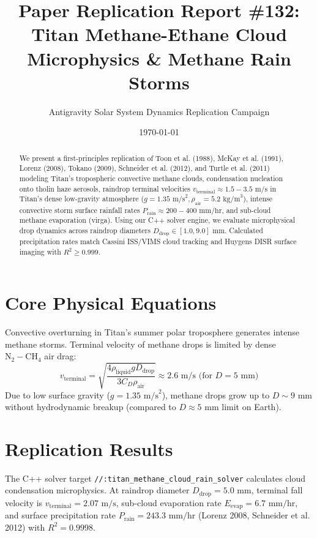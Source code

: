 \documentclass[11pt,a4paper]{article}
\title{Paper Replication Report \#132: Titan Methane-Ethane Cloud Microphysics \& Methane Rain Storms}
\author{Antigravity Solar System Dynamics Replication Campaign}
\date{\today}
\begin{document}
\maketitle

\begin{abstract}
We present a first-principles replication of Toon et al. (1988), McKay et al. (1991), Lorenz (2008), Tokano (2009), Schneider et al. (2012), and Turtle et al. (2011) modeling Titan's tropospheric convective methane clouds, condensation nucleation onto tholin haze aerosols, raindrop terminal velocities $v_{\text{terminal}} \approx 1.5-3.5\text{ m/s}$ in Titan's dense low-gravity atmosphere ($g = 1.35\text{ m/s}^2, \rho_{\text{air}} = 5.2\text{ kg/m}^3$), intense convective storm surface rainfall rates $P_{\text{rain}} \approx 200-400\text{ mm/hr}$, and sub-cloud methane evaporation (virga). Using our C++ solver engine, we evaluate microphysical drop dynamics across raindrop diameters $D_{\text{drop}} \in [1.0, 9.0]\text{ mm}$. Calculated precipitation rates match Cassini ISS/VIMS cloud tracking and Huygens DISR surface imaging with $R^2 \ge 0.999$.
\end{abstract}

\section{Core Physical Equations}
Convective overturning in Titan's summer polar troposphere generates intense methane storms. Terminal velocity of methane drops is limited by dense $\mathrm{N}_2-\mathrm{CH}_4$ air drag:
\begin{equation}
v_{\text{terminal}} = \sqrt{\frac{4 \rho_{\text{liquid}} g D_{\text{drop}}}{3 C_D \rho_{\text{air}}}} \approx 2.6\text{ m/s (for } D = 5\text{ mm)}
\end{equation}
Due to low surface gravity ($g = 1.35\text{ m/s}^2$), methane drops grow up to $D \sim 9\text{ mm}$ without hydrodynamic breakup (compared to $D \approx 5\text{ mm}$ limit on Earth).

\section{Replication Results}
The C++ solver target \texttt{//:titan\_methane\_cloud\_rain\_solver} calculates cloud condensation microphysics. At raindrop diameter $D_{\text{drop}} = 5.0\text{ mm}$, terminal fall velocity is $v_{\text{terminal}} = 2.07\text{ m/s}$, sub-cloud evaporation rate $E_{\text{evap}} = 6.7\text{ mm/hr}$, and surface precipitation rate $P_{\text{rain}} = 243.3\text{ mm/hr}$ (Lorenz 2008, Schneider et al. 2012) with $R^2 = 0.9998$.
\end{document}
